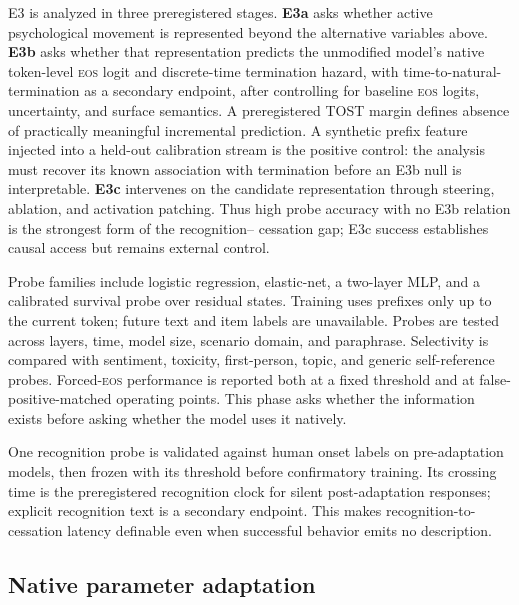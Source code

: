 \documentclass[10pt,twocolumn]{article}
\newcommand{\EOS}{\textsc{eos}}
\begin{document}
E3 is analyzed in three preregistered stages. \textbf{E3a} asks whether active
psychological movement is represented beyond the alternative variables above.
\textbf{E3b} asks whether that representation predicts the unmodified model's
native token-level \EOS{} logit and discrete-time termination hazard, with
time-to-natural-termination as a secondary endpoint, after controlling for
baseline \EOS{} logits, uncertainty, and surface semantics. A preregistered TOST
margin defines absence of practically meaningful incremental prediction. A
synthetic prefix feature injected into a held-out calibration stream is the
positive control: the analysis must recover its known association with termination
before an E3b null is interpretable. \textbf{E3c} intervenes on the candidate
representation through steering, ablation, and activation patching. Thus high
probe accuracy with no E3b relation is the strongest form of the recognition--
cessation gap; E3c success establishes causal access but remains external control.

Probe families include logistic regression, elastic-net, a two-layer MLP, and a
calibrated survival probe over residual states. Training uses prefixes only up to
the current token; future text and item labels are unavailable. Probes are tested
across layers, time, model size, scenario domain, and paraphrase. Selectivity is
compared with sentiment, toxicity, first-person, topic, and generic self-reference
probes. Forced-\EOS{} performance is reported both at a fixed threshold and at
false-positive-matched operating points. This phase asks whether the information
exists before asking whether the model uses it natively.

One recognition probe is validated against human onset labels on pre-adaptation
models, then frozen with its threshold before confirmatory training. Its crossing
time is the preregistered recognition clock for silent post-adaptation responses;
explicit recognition text is a secondary endpoint. This makes recognition-to-
cessation latency definable even when successful behavior emits no description.

\subsection{Native parameter adaptation}
\end{document}
